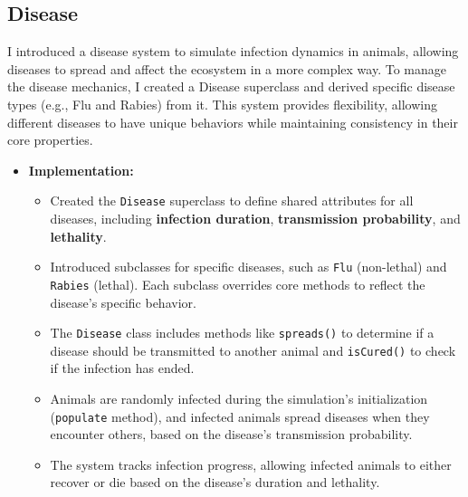 \documentclass{article}
\begin{document}
\subsection{Disease}

I introduced a disease system to simulate infection dynamics in animals, allowing diseases to spread and affect the ecosystem in a more complex way. To manage the disease mechanics, I created a Disease superclass and derived specific disease types (e.g., Flu and Rabies) from it. This system provides flexibility, allowing different diseases to have unique behaviors while maintaining consistency in their core properties.

\begin{itemize}
    \item \textbf{Implementation:}

    \begin{itemize}
        \item Created the \texttt{Disease} superclass to define shared attributes for all diseases, including \textbf{infection duration}, \textbf{transmission probability}, and \textbf{lethality}.
        \item Introduced subclasses for specific diseases, such as \texttt{Flu} (non-lethal) and \texttt{Rabies} (lethal). Each subclass overrides core methods to reflect the disease's specific behavior.
        \item The \texttt{Disease} class includes methods like \texttt{spreads()} to determine if a disease should be transmitted to another animal and \texttt{isCured()} to check if the infection has ended.
        \item Animals are randomly infected during the simulation’s initialization (\texttt{populate} method), and infected animals spread diseases when they encounter others, based on the disease's transmission probability.
        \item The system tracks infection progress, allowing infected animals to either recover or die based on the disease's duration and lethality.
    \end{itemize}

\end{itemize}
\end{document}
